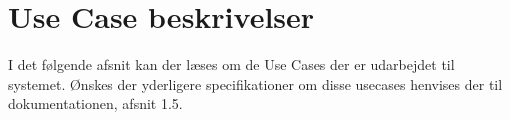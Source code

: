 \section{Use Case beskrivelser}

I det følgende afsnit kan der læses om de Use Cases der er udarbejdet til systemet. Ønskes der yderligere specifikationer om disse usecases henvises der til dokumentationen, afsnit 1.5. \\








